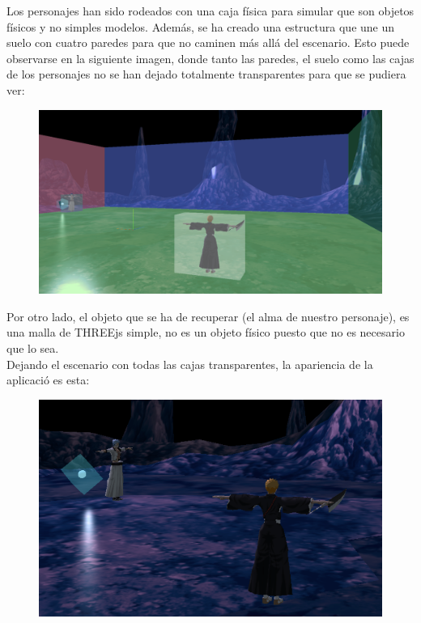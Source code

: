 \documentclass[11pt,a4paper]{article}
\begin{document}
Los personajes han sido rodeados con una caja física para simular que son objetos físicos y no simples modelos. 
Además, se ha creado una estructura que une un suelo con cuatro paredes para que no caminen más allá del escenario. Esto puede observarse en la siguiente imagen, donde tanto las paredes, el suelo como las cajas de los personajes no se han dejado totalmente transparentes para que se pudiera ver:

\begin{figure}[H]
	\centering
	\includegraphics[scale=0.23]{img/fisica.png}
\end{figure}

Por otro lado, el objeto que se ha de recuperar (el alma de nuestro personaje), es una malla de THREEjs simple, no es un objeto físico puesto que no es necesario que lo sea.\\

Dejando el escenario con todas las cajas transparentes, la apariencia de la aplicació es esta:

\begin{figure}[H]
	\centering
	\includegraphics[scale=0.37]{img/inicio.png}
\end{figure}
\end{document}

